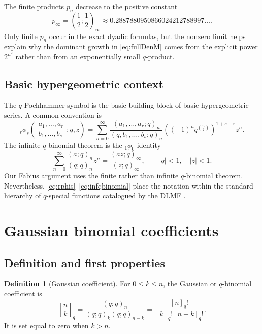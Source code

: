 \documentclass[11pt,oneside]{article}
\theoremstyle{definition}
\newtheorem{definition}[theorem]{Definition}
\theoremstyle{remark}
\newcommand{\qpoch}[3]{\left(#1;#2\right)_{#3}}
\newcommand{\qbinom}[3]{{\genfrac{[}{]}{0pt}{}{#1}{#2}}_{#3}}
\begin{document}
The finite products $p_n$ decrease to the positive constant
\[
  p_\infty=\qpoch{\frac12}{\frac12}{\infty}
  \approx0.2887880950866024212788997\ldots.
\]
Only finite $p_n$ occur in the exact dyadic formulas, but the nonzero limit helps explain why the dominant growth in \eqref{eq:fullDenM} comes from the explicit power $2^{n^2}$ rather than from an exponentially small $q$-product.

\subsection{Basic hypergeometric context}

The $q$-Pochhammer symbol is the basic building block of basic hypergeometric series.  A common convention is
\begin{equation}\label{eq:rphis}
 {}_r\phi_s\!\left(
 \begin{matrix}a_1,\ldots,a_r\\ b_1,\ldots,b_s\end{matrix};q,z\right)
 =\sum_{n=0}^{\infty}
 \frac{\qpoch{a_1,\ldots,a_r}{q}{n}}
      {\qpoch{q,b_1,\ldots,b_s}{q}{n}}
 \left((-1)^nq^{\binom n2}\right)^{1+s-r}z^n.
\end{equation}
The infinite $q$-binomial theorem is the ${}_1\phi_0$ identity
\begin{equation}\label{eq:infqbinomial}
 \sum_{n=0}^{\infty}
 \frac{\qpoch{a}{q}{n}}{\qpoch{q}{q}{n}}z^n
 =\frac{\qpoch{az}{q}{\infty}}{\qpoch{z}{q}{\infty}},
 \qquad |q|<1,\quad |z|<1.
\end{equation}
Our Fabius argument uses the finite rather than infinite $q$-binomial theorem.  Nevertheless, \eqref{eq:rphis}--\eqref{eq:infqbinomial} place the notation within the standard hierarchy of $q$-special functions catalogued by the DLMF \cite{DLMF17}.

\section{Gaussian binomial coefficients}

\subsection{Definition and first properties}

\begin{definition}[Gaussian coefficient]
For $0\le k\le n$, the Gaussian or $q$-binomial coefficient is
\begin{equation}\label{eq:qbindef}
 \qbinom{n}{k}{q}
 =\frac{\qpoch{q}{q}{n}}
        {\qpoch{q}{q}{k}\qpoch{q}{q}{n-k}}
 =\frac{[n]_q!}{[k]_q![n-k]_q!}.
\end{equation}
It is set equal to zero when $k>n$.
\end{definition}
\end{document}
